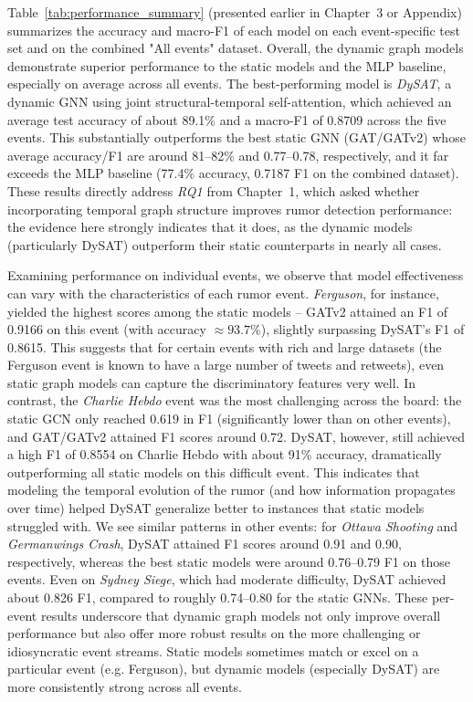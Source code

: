 \documentclass{cshonours}
\begin{document}
Table~\ref{tab:performance_summary} (presented earlier in Chapter~3 or Appendix) summarizes the accuracy and macro-F1 of each model on each event-specific test set and on the combined "All events" dataset. Overall, the dynamic graph models demonstrate superior performance to the static models and the MLP baseline, especially on average across all events. The best-performing model is \emph{DySAT}, a dynamic GNN using joint structural-temporal self-attention, which achieved an average test accuracy of about 89.1\% and a macro-F1 of 0.8709 across the five events. This substantially outperforms the best static GNN (GAT/GATv2) whose average accuracy/F1 are around 81--82\% and 0.77--0.78, respectively, and it far exceeds the MLP baseline (77.4\% accuracy, 0.7187 F1 on the combined dataset). These results directly address \emph{RQ1} from Chapter~1, which asked whether incorporating temporal graph structure improves rumor detection performance: the evidence here strongly indicates that it does, as the dynamic models (particularly DySAT) outperform their static counterparts in nearly all cases.

Examining performance on individual events, we observe that model effectiveness can vary with the characteristics of each rumor event. \emph{Ferguson}, for instance, yielded the highest scores among the static models -- GATv2 attained an F1 of 0.9166 on this event (with accuracy $\approx93.7\%$), slightly surpassing DySAT's F1 of 0.8615. This suggests that for certain events with rich and large datasets (the Ferguson event is known to have a large number of tweets and retweets), even static graph models can capture the discriminatory features very well. In contrast, the \emph{Charlie Hebdo} event was the most challenging across the board: the static GCN only reached 0.619 in F1 (significantly lower than on other events), and GAT/GATv2 attained F1 scores around 0.72. DySAT, however, still achieved a high F1 of 0.8554 on Charlie Hebdo with about 91\% accuracy, dramatically outperforming all static models on this difficult event. This indicates that modeling the temporal evolution of the rumor (and how information propagates over time) helped DySAT generalize better to instances that static models struggled with. We see similar patterns in other events: for \emph{Ottawa Shooting} and \emph{Germanwings Crash}, DySAT attained F1 scores around 0.91 and 0.90, respectively, whereas the best static models were around 0.76--0.79 F1 on those events. Even on \emph{Sydney Siege}, which had moderate difficulty, DySAT achieved about 0.826 F1, compared to roughly 0.74--0.80 for the static GNNs. These per-event results underscore that dynamic graph models not only improve overall performance but also offer more robust results on the more challenging or idiosyncratic event streams. Static models sometimes match or excel on a particular event (e.g. Ferguson), but dynamic models (especially DySAT) are more consistently strong across all events.
\end{document}
